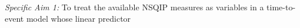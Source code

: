 \emph{Specific Aim 1:} To treat the available NSQIP measures as variables in a time-to-event model whose linear predictor